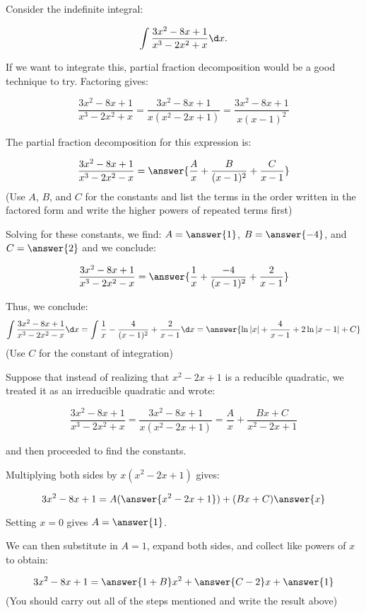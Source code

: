 \documentclass{ximera}
\author{Jim Talamo}
\begin{document}
\begin{exercise}
Consider the indefinite integral: 

\[
\int \frac{3x^2-8x+1}{x^3-2x^2+x} \d x.
\]

If we want to integrate this, partial fraction decomposition would be a good technique to try.  Factoring gives:

\[
\frac{3x^2-8x+1}{x^3-2x^2+x}  =\frac{3x^2-8x+1}{x(x^2-2x+1)} =\frac{3x^2-8x+1}{x(x-1)^2} 
\]  

The partial fraction decomposition for this expression is:

\[
\frac{3x^2-8x+1}{x^3-2x^2-x}= \answer{\frac{A}{x}+\frac{B}{(x-1)^2}+\frac{C}{x-1}}
\]
(Use $A$, $B$, and $C$ for the constants and list the terms in the order written in the factored form and write the higher powers of repeated terms first)

\begin{exercise}
Solving for these constants, we find: $A = \answer{1}$, $B=\answer{-4}$, and $C=\answer{2}$ and we conclude:

\[
\frac{3x^2-8x+1}{x^3-2x^2-x}= \answer{\frac{1}{x}+\frac{-4}{(x-1)^2}+\frac{2}{x-1}}
\]

\begin{exercise}
Thus, we conclude:
\[
\int \frac{3x^2-8x+1}{x^3-2x^2-x} \d x = \int \frac{1}{x}-\frac{4}{(x-1)^2}+\frac{2}{x-1} \d x = \answer{\ln|x|+\frac{4}{x-1}+2\ln|x-1| +C}
\]
(Use $C$ for the constant of integration)


\begin{exercise}
Suppose that instead of realizing that $x^2-2x+1$ is a reducible quadratic, we treated it as an irreducible quadratic and wrote:


\[
\frac{3x^2-8x+1}{x^3-2x^2+x}  =\frac{3x^2-8x+1}{x(x^2-2x+1)} =\frac{A}{x}+\frac{Bx+C}{x^2-2x+1} 
\]  

and then proceeded to find the constants.

\begin{exercise}

Multiplying both sides by $x(x^2-2x+1)$ gives:

\[
3x^2-8x+1 = A(\answer{x^2-2x+1})+(Bx+C)\answer{x}
\]  

\begin{exercise}
Setting $x=0$ gives $A=\answer{1}$.

We can then substitute in $A=1$, expand both sides, and collect like powers of $x$ to obtain:

\[
3x^2-8x+1 = \answer{1+B}x^2+\answer{C-2}x+\answer{1}
\]
(You should carry out all of the steps mentioned and write the result above)


\end{exercise}
\end{exercise}
\end{exercise}
\end{exercise}
\end{exercise}
\end{exercise}
\end{document}

